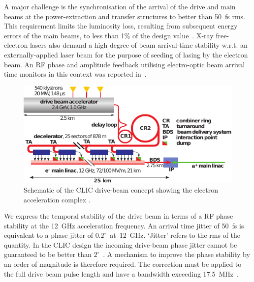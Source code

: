 \documentclass[%
 reprint,
 superscriptaddress,
 amsmath,
 amssymb,
 prl,
]{revtex4-1}
\begin{document}

A major challenge is the synchronisation of the arrival of the drive and main 
beams at the power-extraction and transfer structures to better than 50~fs rms. 
This requirement limits the luminosity loss, resulting from subsequent 
energy errors of the main beams, to less than 1\% of the design 
value~\cite{clicLumEq}. X-ray free-electron lasers also demand a high degree 
of beam arrival-time stability w.r.t. an externally-applied laser beam for the 
purpose of seeding of lasing by the electron beam. An RF phase and amplitude 
feedback utilising electro-optic beam arrival time monitors in this context was 
reported in~\cite{flashPRL}.

\begin{figure}
	\includegraphics[width=\columnwidth]{figs/clicLayout}
	\caption{\label{fig:CLICLayout} Schematic of the CLIC drive-beam 
	concept showing the electron acceleration complex \cite{CLIC-staging}.
	}
\end{figure}

We express the temporal stability of the drive beam in terms of a RF phase 
stability at the 12~GHz acceleration frequency. An arrival time jitter of 50~fs 
is equivalent to a phase jitter of \(0.2^\circ\)~at~12~GHz. `Jitter' refers to 
the rms of the quantity.
In the CLIC design the incoming drive-beam phase jitter 
cannot be guaranteed to be better than \(2^\circ\)~\cite{CLICCDR}. A mechanism 
to improve the phase stability by an order of magnitude is 
therefore required. The correction must be applied to the full drive beam pulse 
length and have a bandwidth exceeding 17.5~MHz~\cite{Gerber2015}. 
\end{document}
